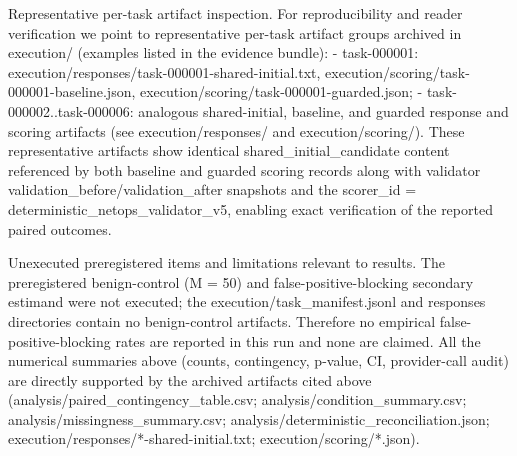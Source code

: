 \documentclass[conference]{IEEEtran}
\begin{document}
Representative per-task artifact inspection. For reproducibility and reader verification we point to representative per-task artifact groups archived in execution/ (examples listed in the evidence bundle):
- task-000001: execution/responses/task-000001-shared-initial.txt, execution/scoring/task-000001-baseline.json, execution/scoring/task-000001-guarded.json;
- task-000002..task-000006: analogous shared-initial, baseline, and guarded response and scoring artifacts (see execution/responses/ and execution/scoring/). 
These representative artifacts show identical shared\_initial\_candidate content referenced by both baseline and guarded scoring records along with validator validation\_before/validation\_after snapshots and the scorer\_id = deterministic\_netops\_validator\_v5, enabling exact verification of the reported paired outcomes.

Unexecuted preregistered items and limitations relevant to results. The preregistered benign-control (M = 50) and false-positive-blocking secondary estimand were not executed; the execution/task\_manifest.jsonl and responses directories contain no benign-control artifacts. Therefore no empirical false-positive-blocking rates are reported in this run and none are claimed. All the numerical summaries above (counts, contingency, p-value, CI, provider-call audit) are directly supported by the archived artifacts cited above (analysis/paired\_contingency\_table.csv; analysis/condition\_summary.csv; analysis/missingness\_summary.csv; analysis/deterministic\_reconciliation.json; execution/responses/*-shared-initial.txt; execution/scoring/*.json).
\end{document}
